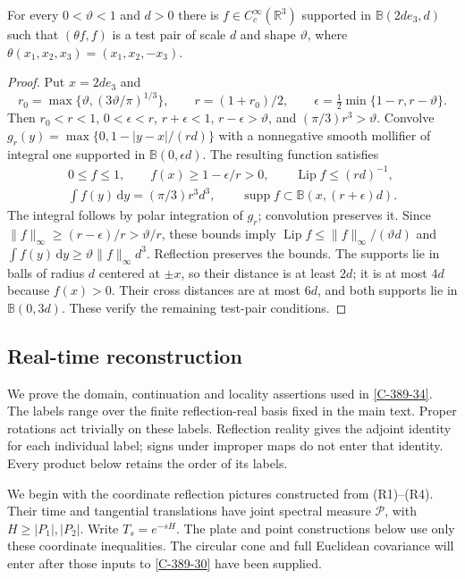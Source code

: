 \documentclass[11pt,letterpaper,reqno]{amsart}
\makeatletter
\theoremstyle{definition}
\newcommand{\ms@minorstart}{%
  \pushQED{\qed}\renewcommand{\qedsymbol}{$\blacksquare$}}
\newenvironment{lemma}[1][]{\ms@minorstart\ms@lemma[#1]}
  {\popQED\endms@lemma}
\theoremstyle{remark}
\makeatother
\begin{document}
\begin{lemma}[Smooth reflection pairs]\label{lem:smooth-reflection-pair}
For every $0<\vartheta<1$ and $d>0$ there is
$f\in C_c^\infty(\mathbb R^3)$ supported in
$\mathbb B(2de_3,d)$ such that $(\theta f,f)$ is a test pair
of scale $d$ and shape $\vartheta$, where
$\theta(x_1,x_2,x_3)=(x_1,x_2,-x_3)$.
\end{lemma}
\begin{proof}
Put $x=2de_3$ and
\[
 r_0=\max\{\vartheta,(3\vartheta/\pi)^{1/3}\},\qquad
 r=(1+r_0)/2,\qquad
 \epsilon=\tfrac12\min\{1-r,r-\vartheta\}.
\]
Then $r_0<r<1$, $0<\epsilon<r$,
$r+\epsilon<1$, $r-\epsilon>\vartheta$, and
$(\pi/3)r^3>\vartheta$.
Convolve $g_r(y)=\max\{0,1-|y-x|/(rd)\}$ with a nonnegative
smooth mollifier of integral one supported in $\mathbb B(0,\epsilon d)$.
The resulting function satisfies
\begin{gather*}
 0\le f\le1,\qquad f(x)\ge1-\epsilon/r>0,\qquad
 \operatorname{Lip}f\le(rd)^{-1},\\
 \int f(y)\,\mathrm{d}y=(\pi/3)r^3d^3,\qquad
 \operatorname{supp}f\subset\mathbb B(x,(r+\epsilon)d).
\end{gather*}
The integral follows by polar integration of $g_r$; convolution
preserves it. Since $\|f\|_\infty\ge(r-\epsilon)/r>\vartheta/r$,
these bounds imply
$\operatorname{Lip}f\le\|f\|_\infty/(\vartheta d)$ and
$\int f(y)\,\mathrm{d}y\ge\vartheta\|f\|_\infty d^3$.
Reflection preserves the bounds. The supports lie in balls of
radius $d$ centered at $\pm x$, so their distance is at least
$2d$; it is at most $4d$ because $f(x)>0$.
Their cross distances are at most $6d$, and both supports lie
in $\mathbb B(0,3d)$. These verify the remaining test-pair conditions.
\end{proof}

\subsection{Real-time reconstruction}\label{app:qcd-reconstruction}

We prove the domain, continuation and locality assertions used in
\cref{C-389-34}. The labels range over the finite reflection-real
basis fixed in the main text. Proper rotations act trivially on
these labels. Reflection reality gives the adjoint identity for
each individual label; signs under improper maps do not enter
that identity. Every product below retains the order of its labels.

We begin with the coordinate reflection pictures constructed
from (R1)--(R4). Their time and tangential translations have
joint spectral measure $\mathcal P$, with
$H\ge|P_1|,|P_2|$. Write $T_s=e^{-sH}$.
The plate and point constructions below use only these
coordinate inequalities. The circular cone and full
Euclidean covariance will enter after those inputs to
\cref{C-389-30} have been supplied.
\end{document}
